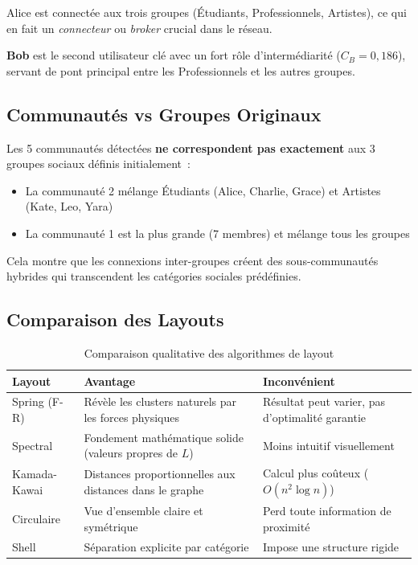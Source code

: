 \documentclass[12pt,a4paper]{article}
\begin{document}
Alice est connectée aux trois groupes (Étudiants, Professionnels, Artistes), ce qui en fait un \emph{connecteur} ou \emph{broker} crucial dans le réseau.

\textbf{Bob} est le second utilisateur clé avec un fort rôle d'intermédiarité ($C_B = 0{,}186$), servant de pont principal entre les Professionnels et les autres groupes.

\subsection{Communautés vs Groupes Originaux}

Les 5 communautés détectées \textbf{ne correspondent pas exactement} aux 3 groupes sociaux définis initialement~:
\begin{itemize}
    \item La communauté 2 mélange Étudiants (Alice, Charlie, Grace) et Artistes (Kate, Leo, Yara)
    \item La communauté 1 est la plus grande (7 membres) et mélange tous les groupes
\end{itemize}

Cela montre que les connexions inter-groupes créent des sous-communautés hybrides qui transcendent les catégories sociales prédéfinies.

\subsection{Comparaison des Layouts}

\begin{table}[H]
\centering
\begin{tabular}{lp{5cm}p{5cm}}
\toprule
\textbf{Layout} & \textbf{Avantage} & \textbf{Inconvénient} \\
\midrule
Spring (F-R) & Révèle les clusters naturels par les forces physiques & Résultat peut varier, pas d'optimalité garantie \\
Spectral & Fondement mathématique solide (valeurs propres de $L$) & Moins intuitif visuellement \\
Kamada-Kawai & Distances proportionnelles aux distances dans le graphe & Calcul plus coûteux ($O(n^2 \log n)$) \\
Circulaire & Vue d'ensemble claire et symétrique & Perd toute information de proximité \\
Shell & Séparation explicite par catégorie & Impose une structure rigide \\
\bottomrule
\end{tabular}
\caption{Comparaison qualitative des algorithmes de layout}
\end{table}
\end{document}
